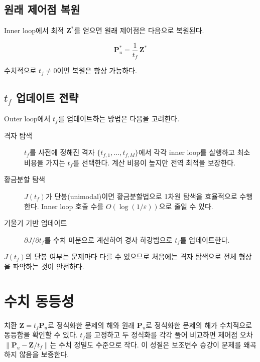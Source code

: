 \documentclass[11pt]{article}
\begin{document}
\subsection{원래 제어점 복원}

Inner loop에서 최적 $\mathbf{Z}^*$를 얻으면 원래 제어점은 다음으로 복원된다.

\begin{equation}
  \mathbf{P}_u^* = \frac{1}{t_f}\,\mathbf{Z}^*
  \label{eq:recovery}
\end{equation}

수치적으로 $t_f \neq 0$이면 복원은 항상 가능하다.

\subsection{$t_f$ 업데이트 전략}

Outer loop에서 $t_f$를 업데이트하는 방법은 다음을 고려한다.

\begin{description}
  \item[격자 탐색] $t_f$를 사전에 정해진 격자 $\{t_{f,1}, \ldots, t_{f,M}\}$에서
        각각 inner loop를 실행하고 최소 비용을 가지는 $t_f$를 선택한다.
        계산 비용이 높지만 전역 최적을 보장한다.
  \item[황금분할 탐색] $J(t_f)$가 단봉(unimodal)이면 황금분할법으로
        1차원 탐색을 효율적으로 수행한다.
        Inner loop 호출 수를 $O(\log(1/\varepsilon))$으로 줄일 수 있다.
  \item[기울기 기반 업데이트] $\partial J/\partial t_f$를 수치 미분으로 계산하여
        경사 하강법으로 $t_f$를 업데이트한다.
\end{description}

$J(t_f)$의 단봉 여부는 문제마다 다를 수 있으므로
처음에는 격자 탐색으로 전체 형상을 파악하는 것이 안전하다.

\section{수치 동등성}

치환 $\mathbf{Z} = t_f \mathbf{P}_u$로 정식화한 문제의 해와
원래 $\mathbf{P}_u$로 정식화한 문제의 해가 수치적으로 동등함을 확인할 수 있다.
$t_f$를 고정하고 두 정식화를 각각 풀어 비교하면
제어점 오차 $\|\mathbf{P}_u - \mathbf{Z}/t_f\|$는 수치 정밀도 수준으로 작다.
이 성질은 보조변수 승강이 문제를 왜곡하지 않음을 보증한다.
\end{document}
